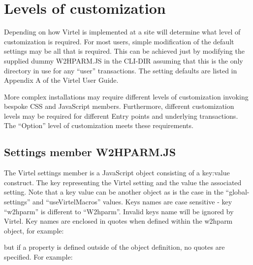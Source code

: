\documentclass[letterpaper,10pt,english]{sphinxmanual}
\begin{document}
\section{Levels of customization}
\label{\detokenize{Customization:levels-of-customization}}
Depending on how Virtel is implemented at a site will determine what level of customization is required. For most users, simple modification of the default settings may be all that is required. This can be achieved just by modifying the supplied dummy W2HPARM.JS in the CLI-DIR assuming that this is the only directory in use for any “user” transactions. The setting defaults are listed in Appendix A of the Virtel User Guide.

More complex installations may require different levels of customization invoking bespoke CSS and JavaScript members. Furthermore, different customization levels may be required for different Entry points and underlying transactions. The “Option” level of customization meets these requirements.

\ignorespaces 

\subsection{Settings member W2HPARM.JS}
\label{\detokenize{Customization:settings-member-w2hparm-js}}\label{\detokenize{Customization:index-0}}
The Virtel settings member is a JavaScript object consisting of a key:value construct. The key representing the Virtel setting and the value the associated setting. Note that a key value can be another object as is the case in the “global-settings” and “useVirtelMacros” values. Keys names are case sensitive - key “w2hparm” is different to “W2hparm”. Invalid keys name will be ignored by Virtel. Key names are enclosed in quotes when defined within the w2hparm object, for example:

\begin{sphinxVerbatim}[commandchars=\\\{\}]
   
\end{sphinxVerbatim}

but if a property is defined outside of the object definition, no quotes are specified. For example:
\end{document}
